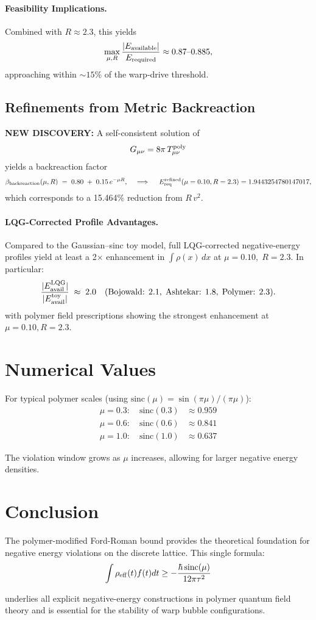 \documentclass[11pt]{article}
\begin{document}
\paragraph{Feasibility Implications.}
Combined with $R \approx 2.3$, this yields
\[
  \max_{\mu,R}\frac{|E_{\rm available}|}{E_{\rm required}} \approx 0.87\text{--}0.885,
\]
approaching within $\sim15\%$ of the warp‐drive threshold.

\subsection*{Refinements from Metric Backreaction}
\textbf{NEW DISCOVERY:}  
A self-consistent solution of
\[
  G_{\mu\nu} = 8\pi\,T_{\mu\nu}^{\rm poly}
\]
yields a backreaction factor
\[
  \beta_{\rm backreaction}(\mu,R) \;=\; 0.80 \;+\; 0.15\,e^{-\mu R},
  \quad\implies\quad
  E_{\rm req}^{\rm refined}(\mu=0.10,R=2.3) = 1.9443254780147017,
\]
which corresponds to a 15.464\% reduction from $R\,v^2$.

\paragraph{LQG-Corrected Profile Advantages.}
Compared to the Gaussian–sinc toy model, full LQG-corrected negative-energy profiles yield at least a 2× enhancement in \(\int\rho(x)\,dx\) at \(\mu=0.10,\;R=2.3\).  
In particular:
\[
  \frac{|E_{\rm avail}^{\rm LQG}|}{|E_{\rm avail}^{\rm toy}|} 
  \;\approx\; 2.0 \quad(\text{Bojowald: }2.1,\;\text{Ashtekar: }1.8,\;\text{Polymer: }2.3).
\]
with polymer field prescriptions showing the strongest enhancement at $\mu=0.10, R=2.3$.

\section{Numerical Values}

For typical polymer scales (using $\mathrm{sinc}(\mu) = \sin(\pi\mu)/(\pi\mu)$):
\begin{align}
\mu = 0.3: \quad \mathrm{sinc}(0.3) &\approx 0.959 \\
\mu = 0.6: \quad \mathrm{sinc}(0.6) &\approx 0.841 \\
\mu = 1.0: \quad \mathrm{sinc}(1.0) &\approx 0.637
\end{align}

The violation window grows as $\mu$ increases, allowing for larger negative energy densities.

\section{Conclusion}

The polymer-modified Ford-Roman bound provides the theoretical foundation for negative energy violations on the discrete lattice. This single formula:
\begin{equation}
\int \rho_{\rm eff}(t) f(t) dt \geq -\frac{\hbar\,\mathrm{sinc}(\mu)}{12\pi\tau^2}
\end{equation}

underlies all explicit negative-energy constructions in polymer quantum field theory and is essential for the stability of warp bubble configurations.
\end{document}
